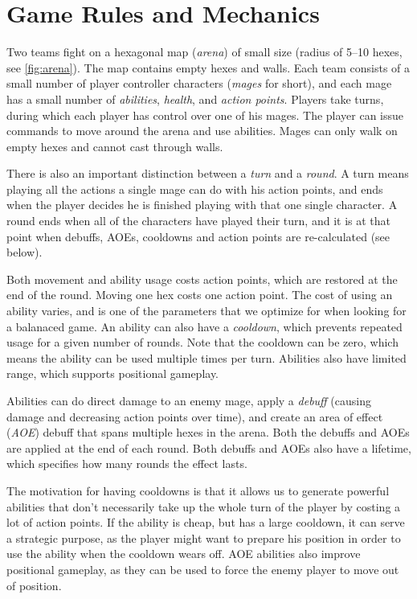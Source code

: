\chapter{Game Rules and Mechanics}
\label{chapter02}

Two teams fight on a hexagonal map (\emph{arena}) of small size (radius of
5--10 hexes, see \autoref{fig:arena}). The map contains empty hexes and walls.
Each team consists of a small number of player controller
characters (\emph{mages} for short), and each mage has a small number of
\emph{abilities}, \emph{health}, and \emph{action points}. Players take turns, during
which each player has control over one of his mages. The player can issue
commands to move around the arena and use abilities. Mages can only walk on empty hexes
and cannot cast through walls.

There is also an important distinction between a \emph{turn} and a \emph{round}.
A turn means playing all the actions a single mage can do with his action points,
and ends when the player decides he is finished playing with that one single character.
A round ends when all of the characters have played their turn, and it is at that point
when debuffs, AOEs, cooldowns and action points are re-calculated (see below).

Both movement and ability usage costs action points, which are restored at the
end of the round. Moving one hex costs one action point. The cost of using an
ability varies, and is one of the parameters that we optimize for when looking
for a balanaced game. An ability can also have a \emph{cooldown}, which
prevents repeated usage for a given number of rounds. Note that the cooldown
can be zero, which means the ability can be used multiple times per turn.
Abilities also have limited range, which supports positional gameplay.

Abilities can do direct damage to an enemy mage, apply a \emph{debuff} (causing
damage and decreasing action points over time), and create an area of effect
(\emph{AOE}) debuff that spans multiple hexes in the arena. Both the debuffs and
AOEs are applied at the end of each round. Both debuffs and AOEs also have a lifetime,
which specifies how many rounds the effect lasts.

The motivation for having cooldowns is that it allows us to generate powerful
abilities that don't necessarily take up the whole turn of the player by costing
a lot of action points. If the ability is cheap, but has a large cooldown, it can
serve a strategic purpose, as the player might want to prepare his position in order
to use the ability when the cooldown wears off. AOE abilities also improve positional
gameplay, as they can be used to force the enemy player to move out of position.

